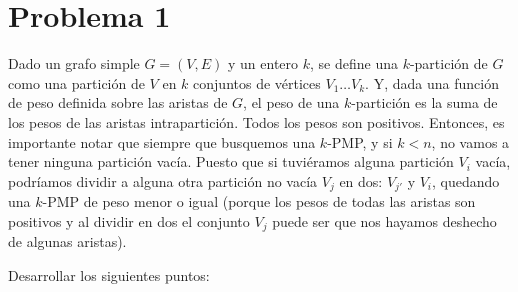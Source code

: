 \documentclass[11pt, a4paper, twoside]{article}
\begin{document}


\newpage

\section{Problema 1}
Dado un grafo simple $G = (V,E)$ y un entero $k$, se define una $k$-partición de $G$ como
una partición de $V$ en $k$ conjuntos de vértices $V_{1} \dots V_{k}$. Y, dada una función
de peso definida sobre las aristas de $G$, el peso de una $k$-partición es la suma de los pesos
de las aristas intrapartición. Todos los pesos son positivos. Entonces, es importante notar que
siempre que busquemos una $k$-PMP, y si $k < n$, no vamos a tener ninguna partición vacía. Puesto 
que si tuviéramos alguna partición $V_{i}$ vacía, podríamos dividir a alguna otra partición no
vacía $V_{j}$ en dos: $V_{j'}$ y $V_{i}$, quedando una $k$-PMP de peso menor o igual (porque los pesos de
todas las aristas son positivos y al dividir en dos el conjunto $V_{j}$ puede ser que nos hayamos
deshecho de algunas aristas).

Desarrollar los siguientes puntos:
		
\end{document}
